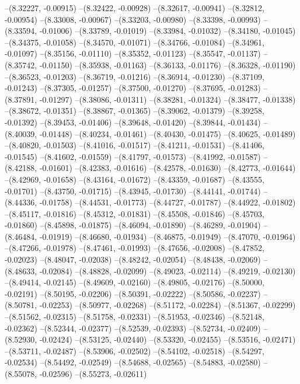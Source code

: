 --(8.32227, -0.00915)
--(8.32422, -0.00928)
--(8.32617, -0.00941)
--(8.32812, -0.00954)
--(8.33008, -0.00967)
--(8.33203, -0.00980)
--(8.33398, -0.00993)
--(8.33594, -0.01006)
--(8.33789, -0.01019)
--(8.33984, -0.01032)
--(8.34180, -0.01045)
--(8.34375, -0.01058)
--(8.34570, -0.01071)
--(8.34766, -0.01084)
--(8.34961, -0.01097)
--(8.35156, -0.01110)
--(8.35352, -0.01123)
--(8.35547, -0.01137)
--(8.35742, -0.01150)
--(8.35938, -0.01163)
--(8.36133, -0.01176)
--(8.36328, -0.01190)
--(8.36523, -0.01203)
--(8.36719, -0.01216)
--(8.36914, -0.01230)
--(8.37109, -0.01243)
--(8.37305, -0.01257)
--(8.37500, -0.01270)
--(8.37695, -0.01283)
--(8.37891, -0.01297)
--(8.38086, -0.01311)
--(8.38281, -0.01324)
--(8.38477, -0.01338)
--(8.38672, -0.01351)
--(8.38867, -0.01365)
--(8.39062, -0.01379)
--(8.39258, -0.01392)
--(8.39453, -0.01406)
--(8.39648, -0.01420)
--(8.39844, -0.01434)
--(8.40039, -0.01448)
--(8.40234, -0.01461)
--(8.40430, -0.01475)
--(8.40625, -0.01489)
--(8.40820, -0.01503)
--(8.41016, -0.01517)
--(8.41211, -0.01531)
--(8.41406, -0.01545)
--(8.41602, -0.01559)
--(8.41797, -0.01573)
--(8.41992, -0.01587)
--(8.42188, -0.01601)
--(8.42383, -0.01616)
--(8.42578, -0.01630)
--(8.42773, -0.01644)
--(8.42969, -0.01658)
--(8.43164, -0.01672)
--(8.43359, -0.01687)
--(8.43555, -0.01701)
--(8.43750, -0.01715)
--(8.43945, -0.01730)
--(8.44141, -0.01744)
--(8.44336, -0.01758)
--(8.44531, -0.01773)
--(8.44727, -0.01787)
--(8.44922, -0.01802)
--(8.45117, -0.01816)
--(8.45312, -0.01831)
--(8.45508, -0.01846)
--(8.45703, -0.01860)
--(8.45898, -0.01875)
--(8.46094, -0.01890)
--(8.46289, -0.01904)
--(8.46484, -0.01919)
--(8.46680, -0.01934)
--(8.46875, -0.01949)
--(8.47070, -0.01964)
--(8.47266, -0.01978)
--(8.47461, -0.01993)
--(8.47656, -0.02008)
--(8.47852, -0.02023)
--(8.48047, -0.02038)
--(8.48242, -0.02054)
--(8.48438, -0.02069)
--(8.48633, -0.02084)
--(8.48828, -0.02099)
--(8.49023, -0.02114)
--(8.49219, -0.02130)
--(8.49414, -0.02145)
--(8.49609, -0.02160)
--(8.49805, -0.02176)
--(8.50000, -0.02191)
--(8.50195, -0.02206)
--(8.50391, -0.02222)
--(8.50586, -0.02237)
--(8.50781, -0.02253)
--(8.50977, -0.02268)
--(8.51172, -0.02284)
--(8.51367, -0.02299)
--(8.51562, -0.02315)
--(8.51758, -0.02331)
--(8.51953, -0.02346)
--(8.52148, -0.02362)
--(8.52344, -0.02377)
--(8.52539, -0.02393)
--(8.52734, -0.02409)
--(8.52930, -0.02424)
--(8.53125, -0.02440)
--(8.53320, -0.02455)
--(8.53516, -0.02471)
--(8.53711, -0.02487)
--(8.53906, -0.02502)
--(8.54102, -0.02518)
--(8.54297, -0.02534)
--(8.54492, -0.02549)
--(8.54688, -0.02565)
--(8.54883, -0.02580)
--(8.55078, -0.02596)
--(8.55273, -0.02611)
